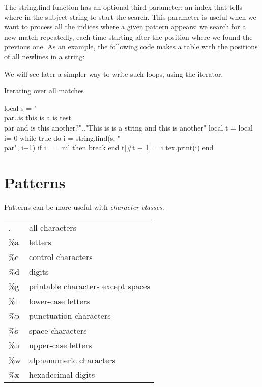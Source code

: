 The string.find function has an optional third parameter: an index that
tells where in the subject string to start the search. This parameter is useful
when we want to process all the indices where a given pattern appears: we
search for a new match repeatedly, each time starting after the position where
we found the previous one. As an example, the following code makes a table
with the positions of all newlines in a string:

We will see later a simpler way to write such loops, using the 
iterator.

\begin{texexample}{Iterating over all matches}{}
\edef\tempstring{\string\\par..is this is a is test \string\\par and is this another?}
\begin{luacode}
local s = "\tempstring".."This is is a string and this is another"
local t = {}
local i= 0
while true do
    i = string.find(s, "\\par", i+1)
    if i == nil then break end
    t[#t + 1] = i
    tex.print(i)
end
   
\end{luacode}
\end{texexample}

\section{Patterns}

Patterns can be more useful with \textit{character classes}. 

\begin{longtable}{>{\color{blue}}ll}
. & all characters\\
\%a & letters\\
\%c &control characters\\
\%d &digits\\ 
\%g &printable characters except spaces\\
\%l &lower-case letters\\
\%p &punctuation characters\\
\%s &space characters\\
\%u  &upper-case letters\\
\%w  &alphanumeric characters\\
\%x  &hexadecimal digits\\
\end{longtable}




